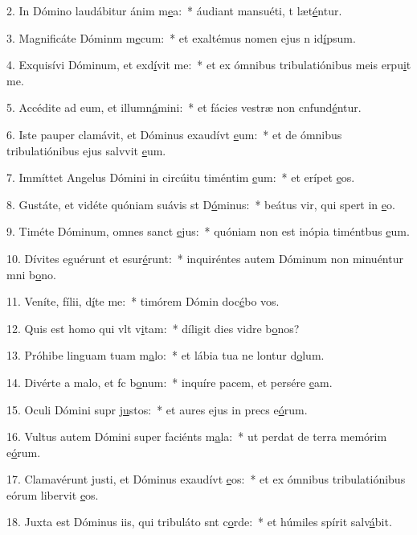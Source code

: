 2. In Dómino laudábitur ánim m\uline{e}a:~* áudiant mansuéti, t læt\uline{é}ntur.\par 
3. Magnificáte Dóminm m\uline{e}cum:~* et exaltémus nomen ejus n id\uline{í}psum.\par 
4. Exquisívi Dóminum, et exd\uline{í}vit me:~* et ex ómnibus tribulatiónibus meis erpu\uline{i}t me.\par 
5. Accédite ad eum, et illumn\uline{á}mini:~* et fácies vestræ non cnfund\uline{é}ntur.\par 
6. Iste pauper clamávit, et Dóminus exaudívt \uline{e}um:~* et de ómnibus tribulatiónibus ejus salvvit \uline{e}um.\par 
7. Immíttet Angelus Dómini in circúitu timéntim \uline{e}um:~* et erípet \uline{e}os.\par 
8. Gustáte, et vidéte quóniam suávis st D\uline{ó}minus:~* beátus vir, qui spert in \uline{e}o.\par 
9. Timéte Dóminum, omnes sanct \uline{e}jus:~* quóniam non est inópia timéntbus \uline{e}um.\par 
10. Dívites eguérunt et esur\uline{é}runt:~* inquiréntes autem Dóminum non minuéntur mni b\uline{o}no.\par 
11. Veníte, fílii, d\uline{í}te me:~* timórem Dómin doc\uline{é}bo vos.\par 
12. Quis est homo qui vlt v\uline{i}tam:~* díligit dies vidre b\uline{o}nos?\par 
13. Próhibe linguam tuam  m\uline{a}lo:~* et lábia tua ne lontur d\uline{o}lum.\par 
14. Divérte a malo, et fc b\uline{o}num:~* inquíre pacem, et persére \uline{e}am.\par 
15. Oculi Dómini supr j\uline{u}stos:~* et aures ejus in precs e\uline{ó}rum.\par 
16. Vultus autem Dómini super faciénts m\uline{a}la:~* ut perdat de terra memórim e\uline{ó}rum.\par 
17. Clamavérunt justi, et Dóminus exaudívt \uline{e}os:~* et ex ómnibus tribulatiónibus eórum libervit \uline{e}os.\par 
18. Juxta est Dóminus iis, qui tribuláto snt c\uline{o}rde:~* et húmiles spírit salv\uline{á}bit.\par 
